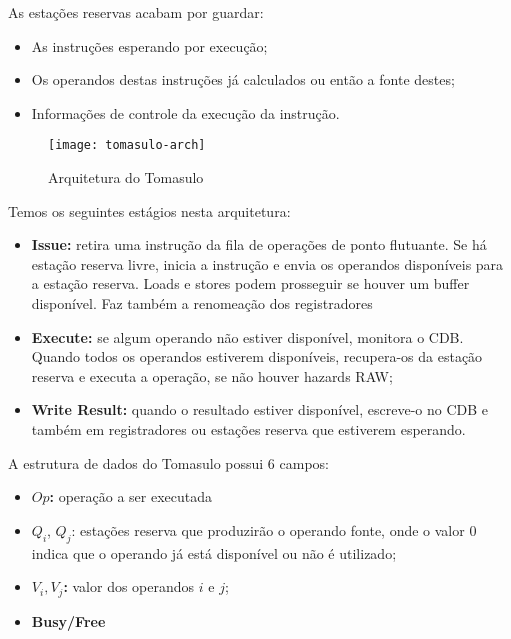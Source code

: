 As estações reservas acabam por guardar:
\begin{itemize}
  \item As instruções esperando por execução;
  \item Os operandos destas instruções já calculados ou então a fonte destes;
  \item Informações de controle da execução da instrução.
\end{itemize}

\begin{figure}[ht]
  \centering
  \texttt{[image: tomasulo-arch]}
  \caption{Arquitetura do Tomasulo}
  \label{fig:tomasulo-arch}
\end{figure}

Temos os seguintes estágios nesta arquitetura:
\begin{itemize}
  \item \textbf{Issue:} retira uma instrução da fila de operações de ponto flutuante. Se há estação reserva livre, inicia a instrução e envia os operandos disponíveis para a estação reserva. Loads e stores podem prosseguir se houver um buffer disponível. Faz também a renomeação dos registradores

  \item \textbf{Execute:} se algum operando não estiver disponível, monitora o CDB. Quando todos os operandos estiverem disponíveis, recupera-os da estação reserva e executa a operação, se não houver hazards RAW;

  \item \textbf{Write Result:} quando o resultado estiver disponível, escreve-o no CDB e também em registradores ou estações reserva que estiverem esperando.
\end{itemize}

A estrutura de dados do Tomasulo possui 6 campos:
\begin{itemize}
  \item \textbf{$Op$:} operação a ser executada

  \item $Q_i$, $Q_j$: estações reserva que produzirão o operando fonte, onde o valor 0 indica que o operando já está disponível ou não é utilizado;

  \item \textbf{$V_i, V_j$:} valor dos operandos $i$ e $j$;

  \item \textbf{Busy/Free}
\end{itemize}

